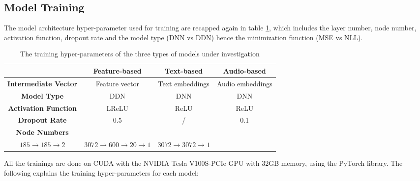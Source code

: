 \subsection{Model Training}
The model architecture hyper-parameter used for training are recapped again in table \ref{tab:models_hyper_param}, which includes the layer number, node number, activation function, dropout rate and the model type (DNN vs DDN) hence the minimization function (MSE vs NLL).

\begin{table}[H]
    \centering
    \begin{tabular}{|c|c|c|c|}
        \hline
                                     & \textbf{Feature-based}                              & \textbf{Text-based}                   & \textbf{Audio-based} \\ \hline
        \textbf{Intermediate Vector} & Feature vector                                      & Text embeddings                       & Audio embeddings     \\ \hline
        \textbf{Model Type}          & DDN                                                 & DNN                                   & DNN                  \\ \hline
        \textbf{Activation Function} & LReLU                                               & ReLU                                  & ReLU                 \\ \hline
        \textbf{Dropout Rate}        & 0.5                                                 & /                                     & 0.1                  \\ \hline
        \textbf{Node Numbers}        & \makecell[l]{                                                                                                      %
        $356 \rightarrow 185 \rightarrow$                                                                                                                 \\%
            $185 \rightarrow 185 \rightarrow 2$%
        }
                                     & $3072 \rightarrow 600 \rightarrow 20 \rightarrow 1$ & $3072 \rightarrow 3072 \rightarrow 1$                        \\ \hline
    \end{tabular}
    \caption{The training hyper-parameters of the three types of models under investigation}
    \label{tab:models_hyper_param}
\end{table}


All the trainings are done on CUDA with the NVIDIA Tesla V100S-PCIe GPU with 32GB memory, using the PyTorch library. The following explains the training hyper-parameters for each model:

